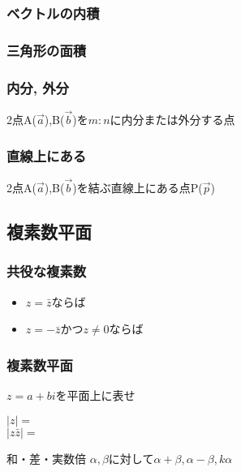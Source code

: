 \documentclass[10pt,dvipdfmx]{jsarticle}
\begin{document}
\subsubsection*{ベクトルの内積}
\vspace{10mm}

\subsubsection*{三角形の面積}
\vspace{10mm}

\subsubsection*{内分, 外分}
2点A($\vec{a}$),B($\vec{b}$)を$m:n$に内分または外分する点
\vspace{10mm}

\subsubsection*{直線上にある}
2点A($\vec{a}$),B($\vec{b}$)を結ぶ直線上にある点P($\vec{p}$)
\vspace{10mm}


\newpage
\subsection*{複素数平面}
\subsubsection*{共役な複素数}
\begin{itemize}
  \item $z=\bar{z}$ならば
  \item $z=-\bar{z}かつz\not=0$ならば
\end{itemize}

\subsubsection*{複素数平面}
\begin{multicols}{2}
  \begin{itembox}[l]{$z=a+bi$を平面上に表せ}

    $|z|=$\\
    $|z\bar{z}|=$
  \end{itembox}
  \begin{itembox}[l]{和・差・実数倍}
    $\alpha,\beta$に対して$\alpha+\beta, \alpha-\beta, k\alpha$\\
  \end{itembox}
\end{multicols}
\end{document}
